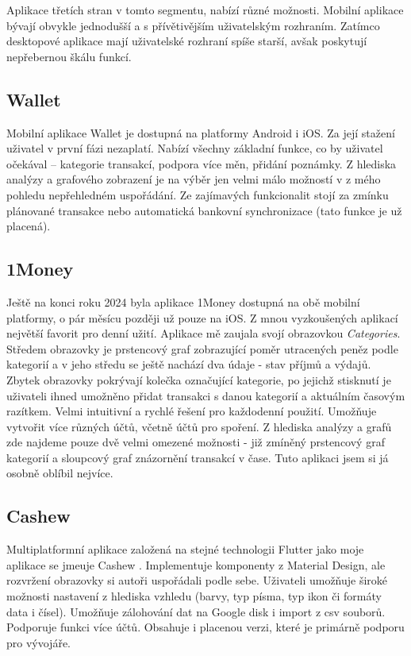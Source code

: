 \documentclass[
  biblatex,
  figures=true,
  tables=false,
  glossaries,
  index
]{kidiplom}
\begin{document}
Aplikace třetích stran v tomto segmentu, nabízí různé možnosti. Mobilní aplikace bývají obvykle jednodušší a s přívětivějším uživatelským rozhraním. Zatímco desktopové aplikace mají uživatelské rozhraní spíše starší, avšak poskytují nepřebernou škálu funkcí.

\subsection{Wallet}
Mobilní aplikace Wallet \cite{wallet} je dostupná na platformy Android i iOS. Za její stažení uživatel v první fázi nezaplatí. Nabízí všechny základní funkce, co by uživatel očekával -- kategorie transakcí, podpora více měn, přidání poznámky. Z hlediska analýzy a grafového zobrazení je na výběr jen velmi málo možností v z mého pohledu nepřehledném uspořádání. Ze zajímavých funkcionalit stojí za zmínku plánované transakce nebo automatická bankovní synchronizace (tato funkce je už placená).

\subsection{1Money}
Ještě na konci roku 2024 byla aplikace 1Money dostupná na obě mobilní platformy, o pár měsícu později už pouze na iOS. Z mnou vyzkoušených aplikací největší favorit pro denní užití. Aplikace mě zaujala svojí obrazovkou \textit{Categories}.  Středem obrazovky je prstencový graf zobrazující poměr utracených peněz podle kategorií a v jeho středu se ještě nachází dva údaje - stav příjmů a výdajů. Zbytek obrazovky pokrývají kolečka označující kategorie, po jejichž stisknutí je uživateli ihned umožněno přidat transakci s danou kategorií a aktuálním časovým razítkem. Velmi intuitivní a rychlé řešení pro každodenní použití. Umožňuje vytvořit více různých účtů, včetně účtů pro spoření. Z hlediska analýzy a grafů zde najdeme pouze dvě velmi omezené možnosti - již zmíněný prstencový graf kategorií a sloupcový graf znázornění transakcí v čase. Tuto aplikaci jsem si já osobně oblíbil nejvíce.

\subsection{Cashew}
Multiplatformní aplikace založená na stejné technologii Flutter jako moje aplikace se jmeuje Cashew \cite{cashew}. Implementuje komponenty z Material Design, ale rozvržení obrazovky si autoři uspořádali podle sebe. Uživateli umožňuje široké možnosti nastavení z hlediska vzhledu (barvy, typ písma, typ ikon či formáty data i čísel). Umožňuje zálohování dat na Google disk i import z csv souborů. Podporuje funkci více účtů. Obsahuje i placenou verzi, které je primárně podporu pro vývojáře.
\end{document}
